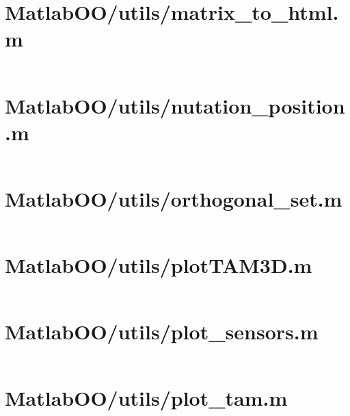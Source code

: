 \pagebreak
\section{MatlabOO/utils/matrix\_to\_html.m}\label{code:MatlabOO/utils/matrix_to_html.m}
\inputminted[linenos,fontsize=\scriptsize]{matlab}{/home/dcouture/git/mathyourlife/TSatPy/beta_versions/matlab_object_oriented/utils/matrix_to_html.m}

\pagebreak
\section{MatlabOO/utils/nutation\_position.m}\label{code:MatlabOO/utils/nutation_position.m}
\inputminted[linenos,fontsize=\scriptsize]{matlab}{/home/dcouture/git/mathyourlife/TSatPy/beta_versions/matlab_object_oriented/utils/nutation_position.m}

\pagebreak
\section{MatlabOO/utils/orthogonal\_set.m}\label{code:MatlabOO/utils/orthogonal_set.m}
\inputminted[linenos,fontsize=\scriptsize]{matlab}{/home/dcouture/git/mathyourlife/TSatPy/beta_versions/matlab_object_oriented/utils/orthogonal_set.m}

\pagebreak
\section{MatlabOO/utils/plotTAM3D.m}\label{code:MatlabOO/utils/plotTAM3D.m}
\inputminted[linenos,fontsize=\scriptsize]{matlab}{/home/dcouture/git/mathyourlife/TSatPy/beta_versions/matlab_object_oriented/utils/plotTAM3D.m}

\pagebreak
\section{MatlabOO/utils/plot\_sensors.m}\label{code:MatlabOO/utils/plot_sensors.m}
\inputminted[linenos,fontsize=\scriptsize]{matlab}{/home/dcouture/git/mathyourlife/TSatPy/beta_versions/matlab_object_oriented/utils/plot_sensors.m}

\pagebreak
\section{MatlabOO/utils/plot\_tam.m}\label{code:MatlabOO/utils/plot_tam.m}
\inputminted[linenos,fontsize=\scriptsize]{matlab}{/home/dcouture/git/mathyourlife/TSatPy/beta_versions/matlab_object_oriented/utils/plot_tam.m}

